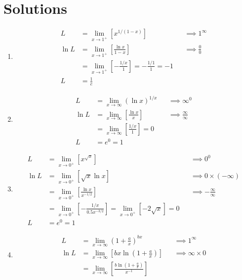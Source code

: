 \documentclass[12pt, A4]{report}
\begin{document}
		\section*{Solutions}
			\begin{enumerate}
				\item
					\begin{align*}
						L &= \lim_{x\to 1^+}\left[x^{1/(1-x)}\right]
								&&\implies 1^{\infty} \\
						\ln L &= \lim_{x\to 1^+}\left[\frac{\ln x}{1 - x}\right]
								&&\implies \frac{0}{0} \\
							&= \lim_{x\to 1^+}\left[-\frac{1/x}{1}\right] 
								= -\frac{1/1}{1} = -1 \\
						L &= \frac{1}{e}
					\end{align*}
				\item
					\begin{align*}
						L &= \lim_{x\to\infty} (\ln x)^{1/x}
								&&\implies \infty^0 \\
						\ln L &= \lim_{x\to\infty}\left[\frac{\ln x}{x}\right]
								&&\implies \frac{\infty}{\infty} \\
							&= \lim_{x\to\infty}\left[\frac{1/x}{1}\right] = 0 \\
						L &= e^0 = 1
					\end{align*}
				\item
					\begin{align*}
						L &= \lim_{x\to 0^+}\left[x^{\sqrt{x}}\right] 
							&&\implies 0^0 \\
						\ln L &= \lim_{x\to 0^+}\left[\sqrt{x}\ln x\right] 
							&&\implies 0 \times (-\infty) \\
						&= \lim_{x\to 0^+}\left[\frac{\ln x}{x^{-1/2}}\right] 
							&&\implies -\frac{\infty}{\infty} \\
						&= \lim_{x\to 0^+}\left[-\frac{1/x}{0.5x^{-3/2}}\right] 
							= \lim_{x\to 0^+}\left[-2\sqrt{x}\right] = 0 \\
						L &= e^0 = 1
					\end{align*}
				\item
					\begin{align*}
						L &= \lim_{x\to\infty}\left(1 + \frac{a}{x}\right)^{bx}
								&&\implies 1^{\infty} \\
						\ln L &= \lim_{x\to\infty}\left[bx\ln\left(1 + \frac{a}{x}\right)\right]
								&&\implies \infty \times 0 \\
							&= \lim_{x\to\infty}\left[\frac{b\ln\left(1 + \frac{a}{x}\right)}{x^{-1}}\right]

\end{align*}
\end{enumerate}
\end{document}
